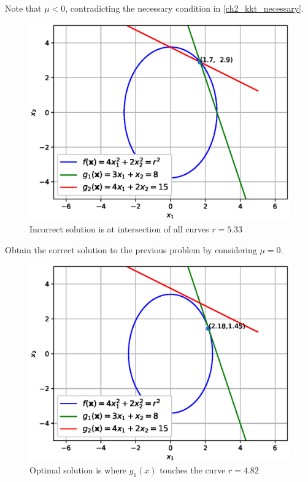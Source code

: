\documentclass[journal,12pt,twocolumn]{IEEEtran}
\begin{document}
%
Note that $\mu < 0 $, contradicting the necessary condition in \eqref{ch2_kkt_necessary}. 
%
\begin{figure}[!ht]
\centering
\includegraphics[width=\columnwidth]{./figs/2.12_1.eps}
\caption{ Incorrect solution is at intersection of all curves $r = 5.33$}
\label{fig.2.12}	
\end{figure}
\begin{problem}
Obtain the correct solution to the previous problem by considering $\mu = 0$.
\end{problem}
\begin{figure}[!ht]
\centering
\includegraphics[width=\columnwidth]{./figs/2.12_2.eps}
\caption{ Optimal solution is where $g_1(x)$ touches the curve $r = 4.82$}
\label{fig.2.13}	
\end{figure}
\end{document}
